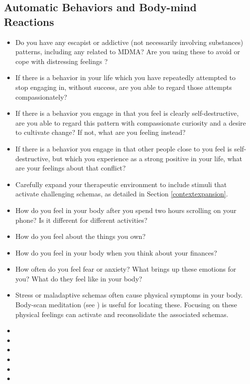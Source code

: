 \documentclass[12pt,letterpaper]{book}
\begin{document}
\subsection*{Automatic Behaviors and Body-mind Reactions}
\begin{itemize}
    \item Do you have any escapist or addictive (not necessarily involving substances) patterns, including any related to MDMA? Are you using these to avoid or cope with distressing feelings \cite{forsterTraumaAddiction,alaviBehavioralAddiction}?
    \item If there is a behavior in your life which you have repeatedly attempted to stop engaging in, without success, are you able to regard those attempts compassionately?
    \item If there is a behavior you engage in that you feel is clearly self-destructive, are you able to regard this pattern with compassionate curiosity and a desire to cultivate change? If not, what are you feeling instead?
    \item If there is a behavior you engage in that other people close to you feel is self-destructive, but which you experience as a strong positive in your life, what are your feelings about that conflict?
    \item Carefully expand your therapeutic environment to include stimuli that activate challenging schemas, as detailed in Section \ref{contextexpansion}.
    \item How do you feel in your body after you spend two hours scrolling on your phone? Is it different for different activities?
    \item How do you feel about the things you own?
    \item How do you feel in your body when you think about your finances?
    \item How often do you feel fear or anxiety? What brings up these emotions for you? What do they feel like in your body?
    \item Stress or maladaptive schemas often cause physical symptoms in your body. Body-scan meditation (see \textcite{bodyscan}) is useful for locating these. Focusing on these physical feelings can activate and reconsolidate the associated schemas.
\end{itemize}

\begin{itemize}
    \item {}
    \item {}
    \item {}
    \item {}
    \item {}
    \item {}
\end{itemize}
\end{document}
